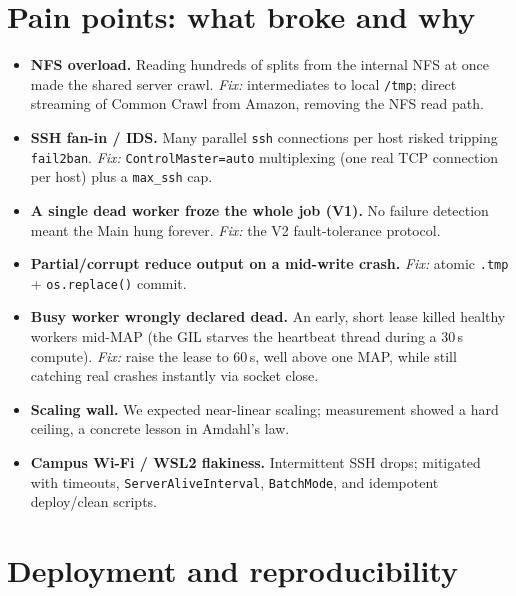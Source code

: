 \documentclass[11pt,a4paper]{article}
\newcommand{\code}[1]{\texttt{\small #1}}
\begin{document}
\section{Pain points: what broke and why}\label{sec:pain}

\begin{itemize}
\item \textbf{NFS overload.} Reading hundreds of splits from the internal NFS at
once made the shared server crawl. \emph{Fix:} intermediates to local \code{/tmp};
direct streaming of Common Crawl from Amazon, removing the NFS read path.
\item \textbf{SSH fan-in / IDS.} Many parallel \code{ssh} connections per host
risked tripping \code{fail2ban}. \emph{Fix:} \code{ControlMaster=auto}
multiplexing (one real TCP connection per host) plus a \code{max\_ssh} cap.
\item \textbf{A single dead worker froze the whole job (V1).} No failure
detection meant the Main hung forever. \emph{Fix:} the V2 fault-tolerance
protocol.
\item \textbf{Partial/corrupt reduce output on a mid-write crash.} \emph{Fix:}
atomic \code{.tmp} + \code{os.replace()} commit.
\item \textbf{Busy worker wrongly declared dead.} An early, short lease killed
healthy workers mid-MAP (the GIL starves the heartbeat thread during a 30\,s
compute). \emph{Fix:} raise the lease to 60\,s, well above one MAP, while still
catching real crashes instantly via socket close.
\item \textbf{Scaling wall.} We expected near-linear scaling; measurement showed
a hard ceiling, a concrete lesson in Amdahl's law.
\item \textbf{Campus Wi-Fi / WSL2 flakiness.} Intermittent SSH drops; mitigated
with timeouts, \code{ServerAliveInterval}, \code{BatchMode}, and idempotent
deploy/clean scripts.
\end{itemize}

\section{Deployment and reproducibility}\label{sec:deploy}
\end{document}
